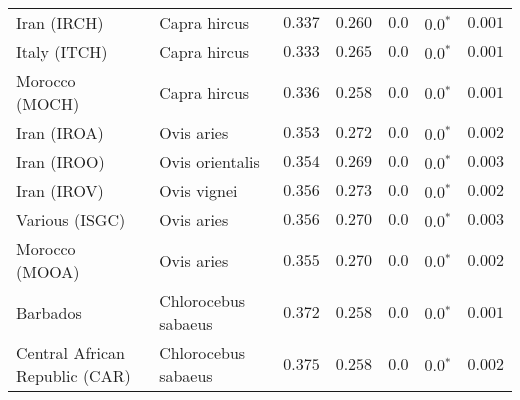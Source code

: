 \begin{center}
\begin{adjustbox}{width = 1\textwidth}
\begin{tabular}{|l|l|r|r|r|r|r|}
                    Iran (IRCH) &         Capra hircus &                                           $ 0.337$ &                                           $ 0.260$ &            $0.0$ &                  $\bm{0.0{^*}}$ &           $ 0.001$ \\
                   Italy (ITCH) &         Capra hircus &                                           $ 0.333$ &                                           $ 0.265$ &            $0.0$ &                  $\bm{0.0{^*}}$ &           $ 0.001$ \\
                 Morocco (MOCH) &         Capra hircus &                                           $ 0.336$ &                                           $ 0.258$ &            $0.0$ &                  $\bm{0.0{^*}}$ &           $ 0.001$ \\
                    Iran (IROA) &           Ovis aries &                                           $ 0.353$ &                                           $ 0.272$ &            $0.0$ &                  $\bm{0.0{^*}}$ &           $ 0.002$ \\
                    Iran (IROO) &      Ovis orientalis &                                           $ 0.354$ &                                           $ 0.269$ &            $0.0$ &                  $\bm{0.0{^*}}$ &           $ 0.003$ \\
                    Iran (IROV) &          Ovis vignei &                                           $ 0.356$ &                                           $ 0.273$ &            $0.0$ &                  $\bm{0.0{^*}}$ &           $ 0.002$ \\
                 Various (ISGC) &           Ovis aries &                                           $ 0.356$ &                                           $ 0.270$ &            $0.0$ &                  $\bm{0.0{^*}}$ &           $ 0.003$ \\
                 Morocco (MOOA) &           Ovis aries &                                           $ 0.355$ &                                           $ 0.270$ &            $0.0$ &                  $\bm{0.0{^*}}$ &           $ 0.002$ \\
                       Barbados &  Chlorocebus sabaeus &                                           $ 0.372$ &                                           $ 0.258$ &            $0.0$ &                  $\bm{0.0{^*}}$ &           $ 0.001$ \\
 Central African Republic (CAR) &  Chlorocebus sabaeus &                                           $ 0.375$ &                                           $ 0.258$ &            $0.0$ &                  $\bm{0.0{^*}}$ &           $ 0.002$ \\

\end{tabular}
\end{adjustbox}
\end{center}
